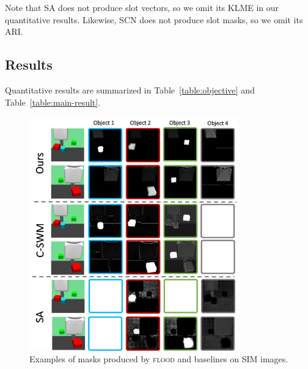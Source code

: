 \documentclass{article}
\begin{document}
Note that SA does not produce slot vectors, so we omit its KLME in our quantitative results. Likewise, SCN does not produce slot masks, so we omit its ARI.





\subsection{Results}
Quantitative results are summarized in Table~\ref{table:objective} and Table~\ref{table:main-result}.
\begin{figure}
  \centering
  \includegraphics[width=9cm]{figs/qual_sim.pdf}
  \caption{Examples of masks produced by \textsc{flood} and baselines on SIM images.}
  \label{fig:qual_sim}
\end{figure}
\end{document}
